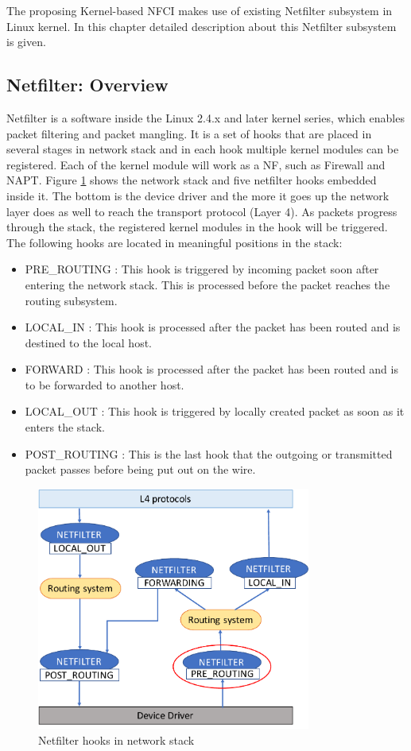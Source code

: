 The proposing Kernel-based NFCI makes use of existing Netfilter subsystem in Linux kernel. In this chapter detailed description about this Netfilter subsystem is given. 

\subsection{Netfilter: Overview}
Netfilter is a software inside the Linux 2.4.x and later kernel series, which enables packet filtering and packet mangling. It is a set of hooks that are placed in several stages in network stack and in each hook multiple kernel modules can be registered. Each of the kernel module will work as a NF, such as Firewall and NAPT. 
Figure \ref{fig: netfilter_system} shows the network stack and five netfilter hooks embedded inside it. The bottom is the device driver and the more it goes up the network layer does as well to reach the transport protocol (Layer 4). As packets progress through the stack, the registered kernel modules in the hook will be triggered. 
The following hooks are located in meaningful positions in the stack:
\begin{itemize}
	\item PRE\_ROUTING : This hook is triggered by incoming packet soon after entering the network stack. This is processed before the packet reaches the routing subsystem.
	\item LOCAL\_IN : This hook is processed after the packet has been routed and is destined to the local host.
	\item FORWARD : This hook is processed after the packet has been routed and is to be forwarded to another host. 
	\item LOCAL\_OUT : This hook is triggered by locally created packet as soon as it enters the stack.
	\item POST\_ROUTING : This is the last hook that the outgoing or transmitted packet passes before being put out on the wire. 
\end{itemize}

\begin{figure}
	\centering
	\includegraphics[width=90mm]{pics/netfilter_system.pdf}
	\caption{Netfilter hooks in network stack}
	\label{fig: netfilter_system}
\end{figure}

